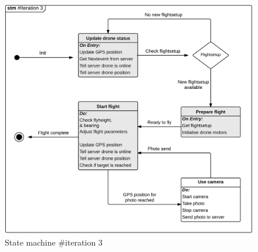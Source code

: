 \vspace{-0.2cm}
\begin{figure}[H]
	\centering
	\includegraphics[width=1\textwidth]{Billeder/statemachine/State_iteration3.png}
	\caption{State machine \#iteration 3}
	\label{fig:Statemachine_iteration3}
\end{figure}

